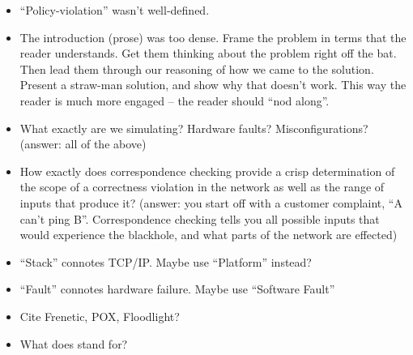 {{\begin{itemize}
\item ``Policy-violation'' wasn't well-defined.
\item The introduction (prose) was too dense. Frame the problem in terms that
the reader understands. Get them thinking about the problem right off the bat.
Then lead them through our reasoning of how we came to the solution. Present
a straw-man solution, and show why that doesn't work. This way
the reader is much more engaged -- the reader should ``nod along''.
\item What exactly are we simulating? Hardware faults? Misconfigurations?
(answer: all of the above)
\item How exactly does correspondence checking provide a crisp determination of the scope of a correctness violation in the
network as well as the range of inputs that produce it? (answer: you start off
with a customer complaint, ``A can't ping B''. Correspondence checking tells
you all possible inputs that would experience the blackhole, and what parts of
the network are effected)
\item ``Stack'' connotes TCP/IP. Maybe use ``Platform'' instead?
\item ``Fault'' connotes hardware failure. Maybe use ``Software Fault''
\item Cite Frenetic, POX, Floodlight?
\item What does \projectname{} stand for?
\end{itemize}
}

}
